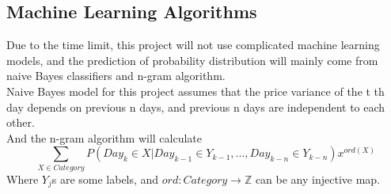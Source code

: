 \documentclass[11pt]{report}
\begin{document}
\subsection{Machine Learning Algorithms}
Due to the time limit, this project will not use complicated machine learning models, and the prediction of probability distribution will mainly come from naive Bayes classifiers and n-gram algorithm.\\
Naive Bayes model for this project assumes that the price variance of the t th day depends on previous n days, and previous n days are independent to each other.\\ 
And the n-gram algorithm will calculate $$\sum_{X\in Category} P({Day}_k \in X | {Day}_{k-1}\in Y_{k-1},...,{Day}_{k-n} \in Y_{k-n})x^{{ord}(X)}$$
Where $Y_j$s are some labels, and $ord : {Category} \rightarrow \mathbb{Z}$ can be any injective map.
\end{document}
